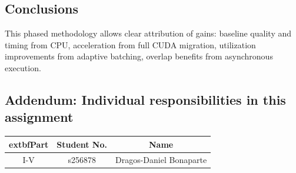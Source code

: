 \subsection{Conclusions}
This phased methodology allows clear attribution of gains: baseline quality and timing from CPU, acceleration from full CUDA migration, 
utilization improvements from adaptive batching, overlap benefits from asynchronous execution. 

\subsection*{Addendum: Individual responsibilities in this assignment}

\begin{table}[H]
\centering
\begin{tabular}{|c|c|c|}
\hline
	extbf{Part} & \textbf{Student No.} & \textbf{Name} \\
\hline
I-V & s256878 & Dragos-Daniel Bonaparte \\
\hline
\end{tabular}
\end{table}
